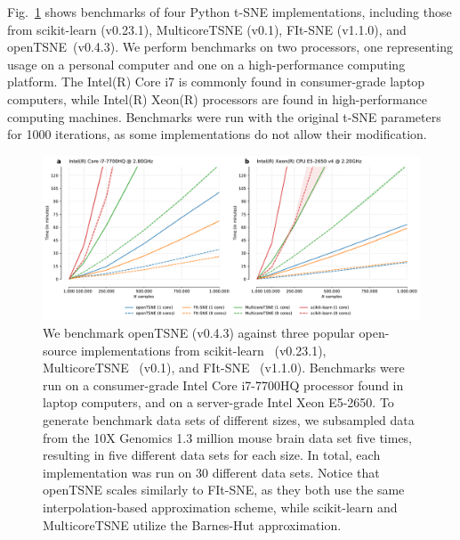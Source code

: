 \documentclass[twocolumn]{bmcart}
\newcommand{\opentsne}{\textsf{openTSNE}}
\begin{document}
Fig.~\ref{fig:benchmarks} shows benchmarks of four Python t-SNE implementations,
including those from \textsf{scikit-learn} (v0.23.1), \textsf{MulticoreTSNE}
(v0.1), \textsf{FIt-SNE} (v1.1.0), and \opentsne\ (v0.4.3). We perform
benchmarks on two processors, one representing usage on a personal computer and
one on a high-performance computing platform. The Intel(R) Core i7 is commonly
found in consumer-grade laptop computers, while Intel(R) Xeon(R) processors are
found in high-performance computing machines. Benchmarks were run with the
original t-SNE parameters for 1000 iterations, as some implementations do not
allow their modification.

\begin{figure}[htbp]
  \includegraphics[width=\textwidth]{benchmarks}
  \caption{\label{fig:benchmarks}We benchmark openTSNE (v0.4.3) against three
	popular open-source implementations from
	scikit-learn~\cite{pedregosa2011scikit} (v0.23.1),
	MulticoreTSNE~\cite{Ulyanov2016} (v0.1), and
	FIt-SNE~\cite{linderman2019fast} (v1.1.0). Benchmarks were run on a
	consumer-grade Intel Core i7-7700HQ processor found in laptop
	computers, and on a server-grade Intel Xeon E5-2650. To generate
	benchmark data sets of different sizes, we subsampled data from the 10X
	Genomics 1.3 million mouse brain data set five times, resulting in five
	different data sets for each size. In total, each implementation was
	run on 30 different data sets. Notice that openTSNE scales similarly to
	FIt-SNE, as they both use the same interpolation-based approximation
	scheme, while scikit-learn and MulticoreTSNE utilize the Barnes-Hut
	approximation.}
\end{figure}
\end{document}
